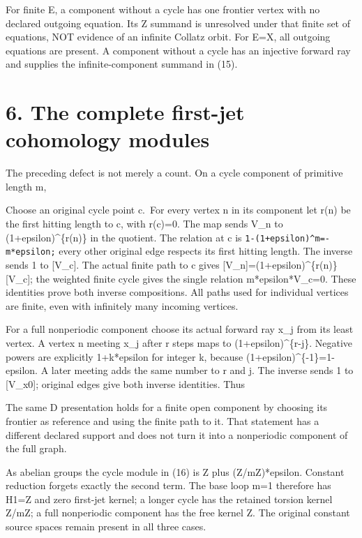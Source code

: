 For finite E, a component without a cycle has one frontier vertex with
no declared outgoing equation. Its Z summand is unresolved under that
finite set of equations, NOT evidence of an infinite Collatz orbit. For
E=X, all outgoing equations are present. A component without a cycle has
an injective forward ray and supplies the infinite-component summand in
(15).

\section{6. The complete first-jet cohomology modules}

The preceding defect is not merely a count. On a cycle component of
primitive length m,


Choose an original cycle point c.~For every vertex n in its component
let r(n) be the first hitting length to c, with r(c)=0. The map sends
V\_n to (1+epsilon)\^{}\{r(n)\} in the quotient. The relation at c is
\nolinkurl{1-(1+epsilon)^m=-m*epsilon;} every other original edge
respects its first hitting length. The inverse sends 1 to {[}V\_c{]}.
The actual finite path to c gives
{[}V\_n{]}=(1+epsilon)\^{}\{r(n)\}{[}V\_c{]}; the weighted finite cycle
gives the single relation m*epsilon*V\_c=0. These identities prove both
inverse compositions. All paths used for individual vertices are finite,
even with infinitely many incoming vertices.

For a full nonperiodic component choose its actual forward ray x\_j from
its least vertex. A vertex n meeting x\_j after r steps maps to
(1+epsilon)\^{}\{r-j\}. Negative powers are explicitly 1+k*epsilon for
integer k, because (1+epsilon)\^{}\{-1\}=1-epsilon. A later meeting adds
the same number to r and j. The inverse sends 1 to {[}V\_x0{]}; original
edges give both inverse identities. Thus


The same D presentation holds for a finite open component by choosing
its frontier as reference and using the finite path to it. That
statement has a different declared support and does not turn it into a
nonperiodic component of the full graph.

As abelian groups the cycle module in (16) is Z plus (Z/mZ)*epsilon.
Constant reduction forgets exactly the second term. The base loop m=1
therefore has H1=Z and zero first-jet kernel; a longer cycle has the
retained torsion kernel Z/mZ; a full nonperiodic component has the free
kernel Z. The original constant source spaces remain present in all
three cases.

